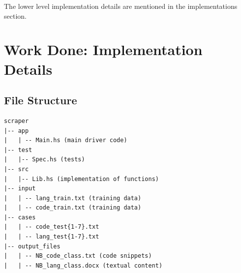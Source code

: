 \documentclass[12pt]{scrreprt}
\newcommand{\ttt}[1]{\texttt{#1}}
\begin{document}
\begin{enumerate}
\begin{enumerate}
    \end{enumerate}

\end{enumerate}

The lower level implementation details are mentioned in the implementations section. 









\chapter{Work Done: Implementation Details}


\section{File Structure}


\begin{verbatim}
scraper
|-- app
|   | -- Main.hs (main driver code)
|-- test
|   |-- Spec.hs (tests)
|-- src
|   |-- Lib.hs (implementation of functions)
|-- input
|   | -- lang_train.txt (training data)
|   | -- code_train.txt (training data)
|-- cases
|   | -- code_test{1-7}.txt
|   | -- lang_test{1-7}.txt
|-- output_files
|   | -- NB_code_class.txt (code snippets)
|   | -- NB_lang_class.docx (textual content)

\end{verbatim}
\end{document}
